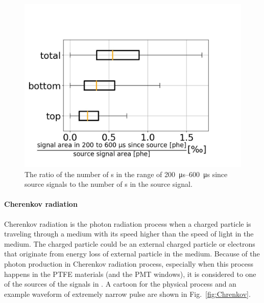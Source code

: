 	\begin{figure}[!p]
		\centering
		\includegraphics[width=.8\textwidth,clip,trim={0 0 0 200}]{Figures/GasTest/DatasetQuality/PMTPTFEFluoRatio0200060064767.jpg}
		\caption[The ratio of the number of photon in the range of \SIrange{200}{600}{\us} since source signals to the number of photons in the source signal.]{The ratio of the number of \sphe s in the range of \SIrange{200}{600}{\us} since source signals to the number of \sphe s in the source signal.}
		\label{fig:PMT PTFE fluo ratio}
	\end{figure}


\paragraph{Cherenkov radiation} 
\label{sec:events Cherenkov}
Cherenkov radiation is the photon radiation process when a charged particle is traveling through a medium with its speed higher than the speed of light in the medium. The charged particle could be an external charged particle or electrons that originate from energy loss of external particle in the medium. Because of the photon production in Cherenkov radiation process, especially when this process happens in the PTFE materials (and the PMT windows), it is considered to one of the sources of the signals in \gtest . A cartoon for the physical process and an example waveform of extremely narrow pulse are shown in Fig.~\ref{fig:Chrenkov}. %

